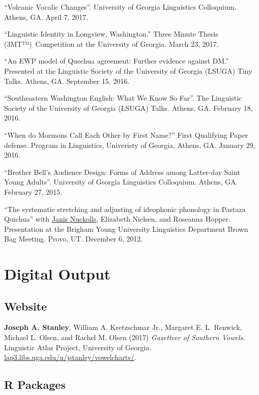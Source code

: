 \documentclass[
]{article}
\begin{document}
``Volcanic Vocalic Changes''. University of Georgia Linguistics
Colloquium. Athens, GA. April 7, 2017.

``Linguistic Identity in Longview, Washington.'' Three Minute Thesis
(3MT™)~Competition at the University of Georgia. March 23, 2017.

``An EWP model of Quechua agreement: Further evidence against DM.''
Presented at the Linguistic Society of the University of Georgia (LSUGA)
Tiny Talks. Athens, GA. September 15, 2016.

``Southeastern Washington English: What We Know So Far''. The Linguistic
Society of the University of Georgia (LSUGA) Talks. Athens, GA. February
18, 2016.

``When do Mormons Call Each Other by First Name?'' First Qualifying
Paper defense. Program in Linguistics, Univeristy of Georgia, Athens,
GA. January 29, 2016.

``Brother Bell's Audience Design: Forms of Address among Latter-day
Saint Young Adults''. University of Georgia Linguistics Colloquium.
Athens, GA. February 27, 2015.

``The systematic stretching and adjusting of ideophonic phonology in
Pastaza Quichua'' with
\href{https://hum.byu.edu/directory/janis-nuckolls}{Janis Nuckolls},
Elizabeth Nielsen, and Roseanna Hopper. Presentation at the Brigham
Young University Linguistics Department Brown Bag Meeting. Provo, UT.
December 6, 2012.

\hypertarget{digital-output}{%
\section{Digital Output}\label{digital-output}}

\hypertarget{website}{%
\subsection{Website}\label{website}}

\textbf{Joseph A. Stanley}, William A. Kretzschmar Jr., Margaret E. L.
Renwick, Michael L. Olsen, and Rachel M. Olsen (2017) \emph{Gazetteer of
Southern Vowels}. Linguistic Atlas Project, University of Georgia.
\href{http://lap3.libs.uga.edu/u/jstanley/vowelcharts/}{lap3.libs.uga.edu/u/jstanley/vowelcharts/}.

\hypertarget{r-packages}{%
\subsection{R Packages}\label{r-packages}}
\end{document}
